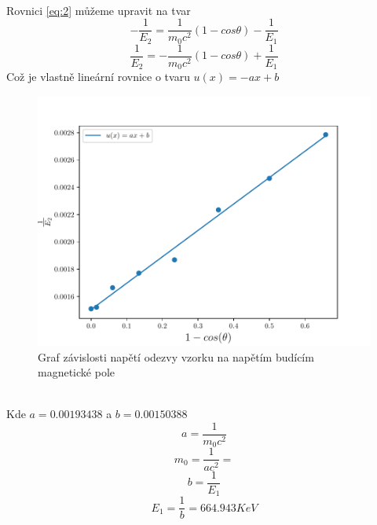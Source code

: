 \documentclass{article}
\begin{document}
\\
\vspace{1em}
\\
\newpage
\\
Rovnici \ref{eq:2} můžeme upravit na tvar\\
$$- \frac{1}{E_{2}} = \frac{1}{m_{0}c^{2}} (1-cos\theta) - \frac{1}{E_{1}}$$
$$\frac{1}{E_{2}} = -\frac{1}{m_{0}c^{2}} (1-cos\theta) + \frac{1}{E_{1}}$$
Což je vlastně lineární rovnice o tvaru $u(x) = -ax + b$
\begin{figure}[h]
  \hspace*{-1em}
  \includegraphics[scale=0.8]{figs/fig2.pdf}
  \caption{Graf závislosti napětí odezvy vzorku na napětím budícím magnetické pole}
\end{figure}
\\
Kde $a = 0.00193438$ a $b = 0.00150388$\\
$$a = \frac{1}{m_{0}c^{2}}$$
$$m_{0} = \frac{1}{ac^{2}} = $$
$$b = \frac{1}{E_{1}}$$
$$E_{1} = \frac{1}{b} = 664.943 KeV$$
\end{document}
